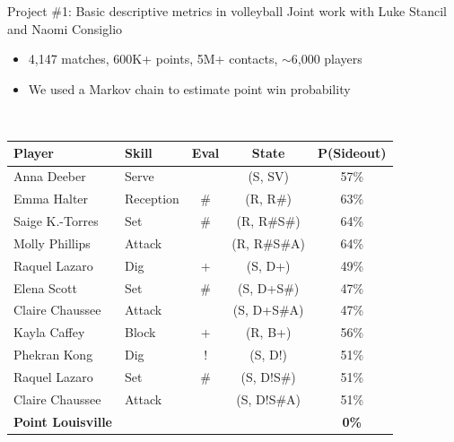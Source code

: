 \documentclass{beamer}
\begin{document}
\begin{frame}{Project \#1: Basic descriptive metrics in volleyball}
  {Joint work with Luke Stancil and Naomi Consiglio}
  \begin{itemize}
    \item 4,147 matches, 600K+ points, 5M+ contacts, $\sim$6,000 players
    \item We used a Markov chain to estimate point win probability
  \end{itemize}
  ~\\
  \small\centering
  \begin{tabular}{llc|cc}
    \bf Player                      & \bf Skill                 & \bf Eval            & \bf State                   & \bf P(Sideout)\\
    \hline
    \color{red} Anna Deeber         & \color{red} Serve         &                     & \color{red} (S, SV)         & \color{orange} 57\%\\
    \color{orange} Emma Halter      & \color{orange} Reception  & \color{orange} \#   & \color{orange} (R, R\#)     & \color{orange} 63\%\\
    \color{orange} Saige K.-Torres  & \color{orange} Set        & \color{orange} \#   & \color{orange} (R, R\#S\#)  & \color{orange} 64\%\\
    \color{orange} Molly Phillips   & \color{orange} Attack     &                     & \color{orange} (R, R\#S\#A) & \color{orange} 64\%\\
    \color{red} Raquel Lazaro       & \color{red} Dig           & \color{red} +       & \color{red} (S, D+)         & \color{orange} 49\%\\
    \color{red} Elena Scott         & \color{red} Set           & \color{red} \#      & \color{red} (S, D+S\#)      & \color{orange} 47\%\\
    \color{red} Claire Chaussee     & \color{red} Attack        &                     & \color{red} (S, D+S\#A)     & \color{orange} 47\%\\
    \color{orange} Kayla Caffey     & \color{orange} Block      & \color{orange} +    & \color{orange} (R, B+)      & \color{orange} 56\%\\
    \color{red} Phekran Kong        & \color{red} Dig           & \color{red} !       & \color{red} (S, D!)         & \color{orange} 51\%\\
    \color{red} Raquel Lazaro       & \color{red} Set           & \color{red} \#      & \color{red} (S, D!S\#)      & \color{orange} 51\%\\
    \color{red} Claire Chaussee     & \color{red} Attack        &                     & \color{red} (S, D!S\#A)     & \color{orange} 51\%\\
    \hline
    \bf\color{red} Point Louisville &                           &                     &                             & \color{orange} \bf 0\%\\
  \end{tabular}
\end{frame}
\end{document}
